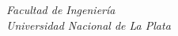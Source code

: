 \begin{titlepage}
\begin{center}
\begin{figure}[H]
\begin{subfigure}
                \end{subfigure}
            \end{figure}
            \vspace{1cm}
            \textit{
            Facultad de Ingeniería
            \\
            Universidad Nacional de La Plata}
            \vspace{1cm}
        \end{center}
    \end{titlepage}
